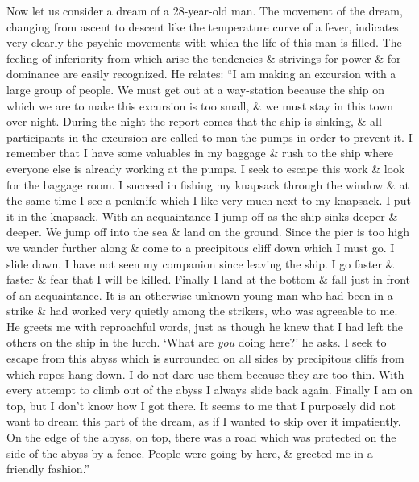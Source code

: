 \documentclass{article}
\begin{document}
Now let us consider a dream of a 28-year-old man. The movement of the dream, changing from ascent to descent like the temperature curve of a fever, indicates very clearly the psychic movements with which the life of this man is filled. The feeling of inferiority from which arise the tendencies \& strivings for power \& for dominance are easily recognized. He relates: ``I am making an excursion with a large group of people. We must get out at a way-station because the ship on which we are to make this excursion is too small, \& we must stay in this town over night. During the night the report comes that the ship is sinking, \& all participants in the excursion are called to man the pumps in order to prevent it. I remember that I have some valuables in my baggage \& rush to the ship where everyone else is already working at the pumps. I seek to escape this work \& look for the baggage room. I succeed in fishing my knapsack through the window \& at the same time I see a penknife which I like very much next to my knapsack. I put it in the knapsack. With an acquaintance I jump off as the ship sinks deeper \& deeper. We jump off into the sea \& land on the ground. Since the pier is too high we wander further along \& come to a precipitous cliff down which I must go. I slide down. I have not seen my companion since leaving the ship. I go faster \& faster \& fear that I will be killed. Finally I land at the bottom \& fall just in front of an acquaintance. It is an otherwise unknown young man who had been in a strike \& had worked very quietly among the strikers, who was agreeable to me. He greets me with reproachful words, just as though he knew that I had left the others on the ship in the lurch. `What are {\it you} doing here?' he asks. I seek to escape from this abyss which is surrounded on all sides by precipitous cliffs from which ropes hang down. I do not dare use them because they are too thin. With every attempt to climb out of the abyss I always slide back again. Finally I am on top, but I don't know how I got there. It seems to me that I purposely did not want to dream this part of the dream, as if I wanted to skip over it impatiently. On the edge of the abyss, on top, there was a road which was protected on the side of the abyss by a fence. People were going by here, \& greeted me in a friendly fashion.''
\end{document}
